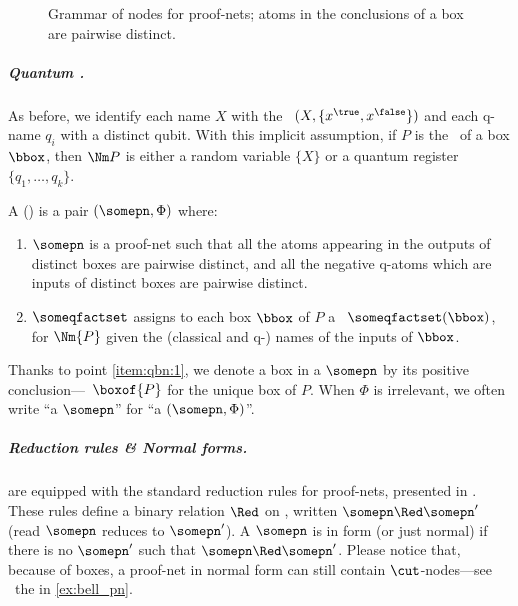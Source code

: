 \begin{figure}
\begin{adjustbox}{}
\end{adjustbox}
\caption{
	Grammar of nodes for proof-nets;
	atoms in the conclusions of a box are pairwise distinct.
}
\label{fig:grammar_nodes_pn}\label{fig:pn}
\end{figure}

\subparagraph{Quantum \pns.}

As before, we identify each name $X$ with the \rv\ $(X, \{x^{\true}, x^{\false}\})$ and each q-name $q_i$ with a distinct qubit.
With this implicit assumption, if $P$ is the \main\ of a box $\bbox$, then $\Nm P$ is either a random variable $\{X\}$ or a quantum register $\{q_1, \dots, q_k\}$.

\begin{definition}\label{def:qbn}
A  (\qbpn) is a pair $(\somepn, \Phi)$ where:
\begin{enumerate}
\item\label{item:qbn:1}
$\somepn$ is a proof-net such that all the atoms appearing in the outputs of distinct boxes are pairwise distinct, and all the negative q-atoms which are inputs of distinct boxes are pairwise distinct.
\item
$\someqfactset$ assigns to each box $\bbox$ of \main $P$ a \qCPT\ $\someqfactset(\bbox)$, for $\Nm{P}$ given the (classical and q-) names of the inputs of $\bbox$.
\end{enumerate}
\end{definition}

Thanks to point \ref{item:qbn:1}, we denote a box in a \qbpn $\somepn$ by its positive conclusion---\eg\ $\boxof{P}$ for the unique box of \main $P$. When $\Phi$ is irrelevant, we often write ``a \qbpn $\somepn$'' for ``a \qbpn $(\somepn,\Phi)$''.

\subparagraph{Reduction rules \& Normal forms.}

\Qpns are equipped with the standard reduction rules for \MLL proof-nets, presented in .
These rules define a binary relation $\Red$ on \qbpns, written $\somepn \Red \somepn'$ (read $\somepn$ reduces to $\somepn'$).
A \qbpn $\somepn$ is in  form (or just normal) if there is no $\somepn'$ such that $\somepn \Red \somepn'$. 
Please notice that, because of boxes, a proof-net in normal form can still contain $\cut$-nodes---see \eg\ the \pn in \cref{ex:bell_pn}.

